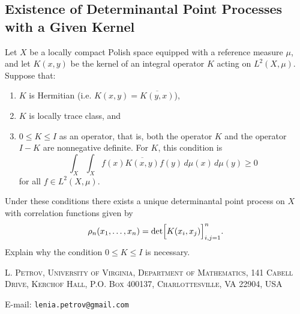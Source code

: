 \documentclass[letterpaper,11pt,oneside,reqno]{article}
\numberwithin{equation}{section}
\theoremstyle{definition}
\begin{document}
\subsection{Existence of Determinantal Point Processes with a Given Kernel}
Let \(X\) be a locally compact Polish space equipped with a reference measure \(\mu\), and let \(K(x,y)\) be the kernel of an integral operator \(K\) acting on \(L^2(X,\mu)\). Suppose that:
\begin{enumerate}
	\item \(K\) is Hermitian (i.e. \(K(x,y)=\overline{K(y,x)}\)),
	\item \(K\) is locally trace class, and
	\item \(0\le K\le I\) as an operator, that is, both the operator \(K\) and the operator \(I-K\) are nonnegative definite. For $K$, this condition is
	\[
	\int_X\int_X f(x)\overline{K(x,y)}f(y)\,d\mu(x)\,d\mu(y)\ge0
	\]
	for all \(f\in L^2(X,\mu)\).
\end{enumerate}
Under these conditions there exists a unique determinantal point process on \(X\) with correlation functions given by
\[
\rho_n(x_1,\dots,x_n)=\det\Bigl[K(x_i,x_j)\Bigr]_{i,j=1}^n.
\]
Explain why the condition \(0\le K\le I\) is necessary.





\medskip

\textsc{L. Petrov, University of Virginia, Department of Mathematics, 141 Cabell Drive, Kerchof Hall, P.O. Box 400137, Charlottesville, VA 22904, USA}

E-mail: \texttt{lenia.petrov@gmail.com}
\end{document}
